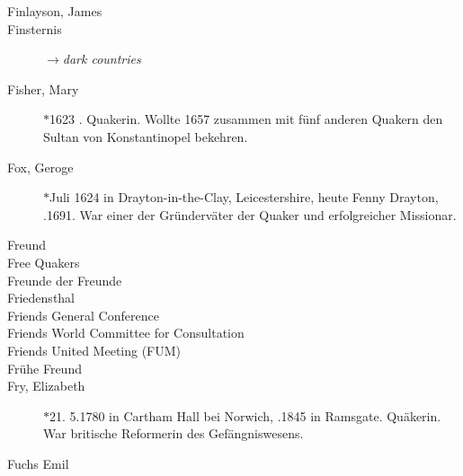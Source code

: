 \begin{description}
 \item[Finlayson, James]

\item[Finsternis] $\to$\textit{dark countries}

 \item[Fisher, Mary] $\ast$1623 . Quakerin. Wollte 1657 zusammen mit fünf anderen Quakern den Sultan von Konstantinopel bekehren.

 \item[Fox, Geroge] $\ast$Juli 1624 in Drayton-in-the-Clay, Leicestershire, heute Fenny Drayton, .1691. War einer der Gründerväter der Quaker und erfolgreicher Missionar.

 \item[Freund]

 \item[Free Quakers]
 
 \item[Freunde der Freunde]

 \item[Friedensthal]

 \item[Friends General Conference]

 \item[Friends World Committee for Consultation]

 \item[Friends United Meeting (FUM)]

 \item[Frühe Freund]

 \item[Fry, Elizabeth] $\ast$21. 5.1780 in Cartham Hall bei Norwich, .1845 in Ramsgate. Quäkerin. War britische Reformerin des Gefängniswesens.

 \item[Fuchs Emil]


 \end{description}

\normalsize